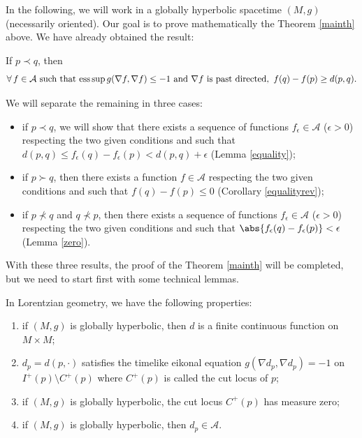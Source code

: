 In the following, we will work in a globally hyperbolic spacetime $(M,g)$ (necessarily oriented). Our goal is to prove mathematically the Theorem \ref{mainth} above. We have already obtained the result:

\begin{lemma}\label{lemmainequa}
If $p \prec q$, then
\begin{gather*}
\forall \, f \in \mathcal A\text{ such that } \text{\rm ess} \sup g( \nabla f, \nabla f ) \leq -1   \text{ and }  \nabla f \text{ is past directed}, \  f(q)-f(p)   \geq  d(p,q).
\end{gather*}
\end{lemma}

We will separate the remaining in three cases:
\begin{itemize}\itemsep=0pt
\item if $p \prec q$, we will show that there exists a sequence of functions $f_\epsilon \in\mathcal A$ ($\epsilon > 0$) respecting the two given conditions and such that $d(p,q) \leq f_\epsilon(q) -f_\epsilon(p) < d(p,q) + \epsilon$ (Lemma \ref{equality});
\item if $p \succ q$, then there exists a function $f \in\mathcal A$ respecting the two given conditions and such that \mbox{$f(q)-f(p) \leq 0$} (Corollary \ref{equalityrev});
\item if $p \nprec q$ and $q \nprec p$, then there exists a sequence of functions $f_\epsilon \in\mathcal A$ ($\epsilon > 0$) respecting the two given conditions and such that $\abs{ f_\epsilon(q) -f_\epsilon(p) } < \epsilon$ (Lemma \ref{zero}).
\end{itemize}

With these three results, the proof of the Theorem \ref{mainth} will be completed, but we need to start f\/irst with some technical lemmas.

\begin{lemma}
In Lorentzian geometry, we have the following properties:
\begin{enumerate}\itemsep=0pt
\item if $(M,g)$ is globally hyperbolic, then $d$ is a finite continuous function on $M \times M$;

\item $d_p = d(p,\cdot) $ satisfies the timelike eikonal equation $g( \nabla d_p , \nabla d_p) = -1$ on $I^+(p) \setminus C^+(p)$ where $C^+(p)$ is called the cut locus of $p$;

\item if $(M,g)$ is globally hyperbolic, the cut locus  $C^+(p)$ has measure zero;

\item  if $(M,g)$ is globally hyperbolic, then $d_p\in\mathcal A$.
\end{enumerate}
\end{lemma}

